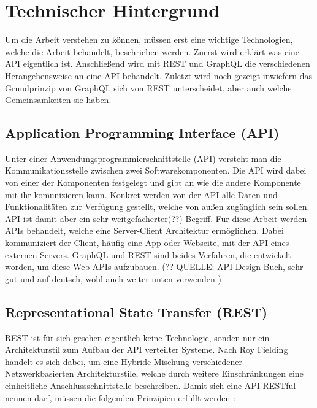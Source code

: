 \chapter{Technischer Hintergrund}

Um die Arbeit verstehen zu können, müssen erst eine wichtige Technologien, welche die Arbeit behandelt, beschrieben werden. Zuerst wird erklärt was eine API eigentlich ist. Anschließend wird mit REST und GraphQL die verschiedenen Herangehensweise an eine API behandelt. Zuletzt wird noch gezeigt inwiefern das Grundprinzip von GraphQL sich von REST unterscheidet, aber auch welche Gemeinsamkeiten sie haben.

\section{Application Programming Interface (API)}

Unter einer Anwendungs­programmier­schnittstelle (API) versteht man die Kommunikationsstelle zwischen zwei Softwarekomponenten. Die API wird dabei von einer der Komponenten festgelegt und gibt an wie die andere Komponente mit ihr komunizieren kann. Konkret werden von der API alle Daten und Funktionalitäten zur Verfügung gestellt, welche von außen zugänglich sein sollen. API ist damit aber ein sehr weitgefächerter(??) Begriff. Für diese Arbeit werden APIs behandelt, welche eine Server-Client Architektur ermöglichen. Dabei kommuniziert der Client, häufig eine App oder Webseite, mit der API eines externen Servers. GraphQL und REST sind beides Verfahren, die entwickelt worden, um diese Web-APIs aufzubauen. (?? QUELLE: API Design Buch, sehr gut und auf deutsch, wohl auch weiter unten verwenden )

\section{Representational State Transfer (REST)}

REST ist für sich gesehen eigentlich keine Technologie, sonden nur ein Architekturstil zum Aufbau der API verteilter Systeme. Nach Roy Fielding handelt es sich dabei, um eine Hybride Mischung verschiedener Netzwerkbasierten Architekturstile, welche durch weitere Einschränkungen eine einheitliche Anschlussschnittstelle beschreiben. Damit sich eine API RESTful nennen darf, müssen die folgenden Prinzipien erfüllt werden \cite{Fielding,2000}:

